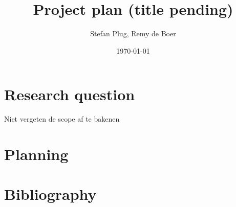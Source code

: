 \documentclass{article}
\begin{document}
\title{Project plan (title pending)}
\author{Stefan Plug, Remy de Boer}
\date{\today}
\maketitle

\section{Research question}
Niet vergeten de scope af te bakenen

\section{Planning}

\section{Bibliography}
\end{document}
